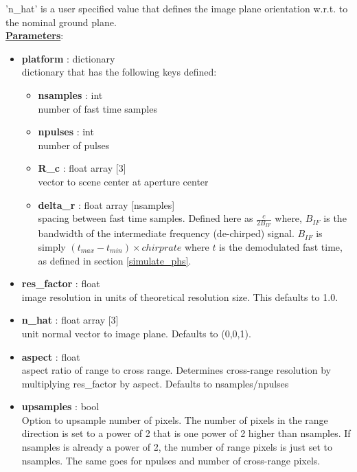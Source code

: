 \documentclass{article}
\newcommand{\defs}[2]{\textbf{{#1}} : {#2}}
\begin{document}
'n\_hat' is a user specified value that defines the image plane orientation w.r.t. to the nominal ground plane.\\

\noindent \underline{\textbf{Parameters}}:

\begin{itemize}
  	\item \defs{platform}{dictionary}\\
  	dictionary that has the following keys defined:
	\begin{itemize}
    	\item \defs{nsamples}{int}\\
    		number of fast time samples
	    \item \defs{npulses}{int}\\
	    	number of pulses
	    \item \defs{R\_c}{float array [3]}\\
	       	vector to scene center at aperture center
	    \item\defs{delta\_r}{float array [nsamples]}\\
	    	spacing between fast time samples.  Defined here as $\frac{c}{2B_{IF}}$ where, $B_{IF}$ is the bandwidth of the intermediate frequency (de-chirped) signal.  $B_{IF}$ is simply $(t_{max}-t_{min})\times chirprate$ where $t$ is the demodulated fast time, as defined in section \ref{simulate_phs}.
	\end{itemize}
	\item\defs{res\_factor}{float}\\
	image resolution in units of theoretical resolution size.  This defaults to 1.0.
	\item\defs{n\_hat}{float array [3]}\\
	unit normal vector to image plane.  Defaults to (0,0,1).
	\item\defs{aspect}{float}\\
	aspect ratio of range to cross range.  Determines cross-range resolution by multiplying res\_factor by aspect.  Defaults to nsamples/npulses
	\item\defs{upsamples}{bool}\\
	Option to upsample number of pixels.  The number of pixels in the range direction is set to a power of 2 that is one power of 2 higher than nsamples.  If nsamples is already a power of 2, the number of range pixels is just set to nsamples.  The same goes for npulses and number of cross-range pixels. 
	
\end{itemize}
\end{document}
